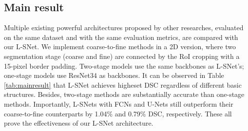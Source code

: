 \documentclass{article}
\begin{document}
\vspace{-15pt}
\subsection{Main result}
\vspace{-5pt}
Multiple existing powerful architectures proposed by other researches, evaluated on the same dataset and with the same evaluation metrics, are compared with our L-SNet.
We implement coarse-to-fine methods \cite{zhou2017fixed, 3dc2f} in a 2D version, where two segmentation stage (coarse and fine) are connected by the RoI cropping with a 15-pixel border padding.
Two-stage models use the same backbones as L-SNet's; one-stage models use ResNet34 as backbones.
It can be observed in Table \ref{tab:mainresult} that L-SNet achieves higheset DSC regardless of different basic structures. Besides, two-stage methods are substantially accurate than one-stage methods. Importantly, L-SNets with FCNs and U-Nets still outperform their coarse-to-fine counterparts by 1.04\% and 0.79\% DSC, respectively. These all prove the effectiveness of our L-SNet architecture. \par
\end{document}
